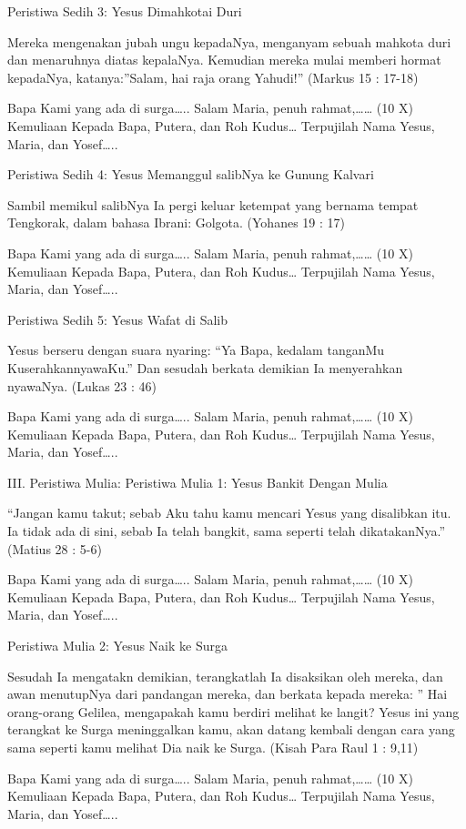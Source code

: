 \documentclass[a5paper,headsepline,titlepage,11pt,nnormalheadings,DIVcalc]{scrbook}
\begin{document}
	Peristiwa Sedih 3: Yesus Dimahkotai Duri

Mereka mengenakan jubah ungu kepadaNya, menganyam sebuah mahkota duri dan menaruhnya diatas kepalaNya. Kemudian mereka mulai memberi hormat kepadaNya, katanya:”Salam, hai raja orang Yahudi!”
(Markus 15 : 17-18)

Bapa Kami yang ada di surga…..
Salam Maria, penuh rahmat,…… (10 X)
Kemuliaan Kepada Bapa, Putera, dan Roh Kudus…
Terpujilah Nama Yesus, Maria, dan Yosef…..

	Peristiwa Sedih 4: Yesus Memanggul salibNya ke Gunung Kalvari

Sambil memikul salibNya Ia pergi keluar ketempat yang bernama tempat Tengkorak, dalam bahasa Ibrani: Golgota.
(Yohanes 19 : 17)

Bapa Kami yang ada di surga…..
Salam Maria, penuh rahmat,…… (10 X)
Kemuliaan Kepada Bapa, Putera, dan Roh Kudus…
Terpujilah Nama Yesus, Maria, dan Yosef…..

	Peristiwa Sedih 5: Yesus Wafat di Salib

Yesus berseru dengan suara nyaring: “Ya Bapa, kedalam tanganMu KuserahkannyawaKu.” Dan sesudah berkata demikian Ia menyerahkan nyawaNya.
(Lukas 23 : 46)

Bapa Kami yang ada di surga…..
Salam Maria, penuh rahmat,…… (10 X)
Kemuliaan Kepada Bapa, Putera, dan Roh Kudus…
Terpujilah Nama Yesus, Maria, dan Yosef…..

III. Peristiwa Mulia:
	Peristiwa Mulia 1: Yesus Bankit Dengan Mulia

“Jangan kamu takut; sebab Aku tahu kamu mencari Yesus yang disalibkan itu. Ia tidak ada di sini, sebab Ia telah bangkit, sama seperti telah dikatakanNya.”
(Matius 28 : 5-6)

Bapa Kami yang ada di surga…..
Salam Maria, penuh rahmat,…… (10 X)
Kemuliaan Kepada Bapa, Putera, dan Roh Kudus…
Terpujilah Nama Yesus, Maria, dan Yosef…..

	Peristiwa Mulia 2: Yesus Naik ke Surga

Sesudah Ia mengatakn demikian, terangkatlah Ia disaksikan oleh mereka, dan awan menutupNya dari pandangan mereka, dan berkata kepada mereka: ” Hai orang-orang Gelilea, mengapakah kamu berdiri melihat ke langit? Yesus ini yang terangkat ke Surga meninggalkan kamu, akan datang kembali dengan cara yang sama seperti kamu melihat Dia naik ke Surga.
(Kisah Para Raul 1 : 9,11)

Bapa Kami yang ada di surga…..
Salam Maria, penuh rahmat,…… (10 X)
Kemuliaan Kepada Bapa, Putera, dan Roh Kudus…
Terpujilah Nama Yesus, Maria, dan Yosef…..
\end{document}
